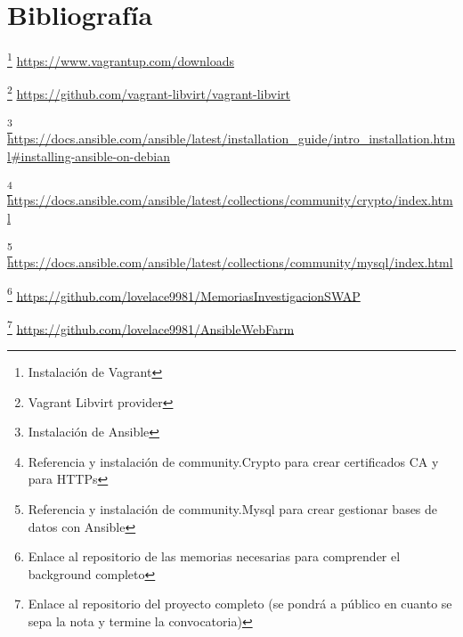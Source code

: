 \newpage
\section{Bibliografía}

\footnote{Instalación de Vagrant}
\textcolor{blue}{\url{https://www.vagrantup.com/downloads}}

\footnote{Vagrant Libvirt provider}
\textcolor{blue}{\url{https://github.com/vagrant-libvirt/vagrant-libvirt}}

\footnote{Instalación de Ansible}
\textcolor{blue}{\url{https://docs.ansible.com/ansible/latest/installation\_guide/intro\_installation.html\#installing-ansible-on-debian}}

\footnote{Referencia y instalación de community.Crypto para crear certificados CA y para HTTPs}
\textcolor{blue}{\url{https://docs.ansible.com/ansible/latest/collections/community/crypto/index.html}}

\footnote{Referencia y instalación de community.Mysql para crear gestionar bases de datos con Ansible}
\textcolor{blue}{\url{https://docs.ansible.com/ansible/latest/collections/community/mysql/index.html}}

\footnote{Enlace al repositorio de las memorias necesarias para comprender el background completo}
\textcolor{blue}{\url{https://github.com/lovelace9981/MemoriasInvestigacionSWAP}}

\footnote{Enlace al repositorio del proyecto completo (se pondrá a público en cuanto se sepa la nota y termine la convocatoria)}
\textcolor{blue}{\url{https://github.com/lovelace9981/AnsibleWebFarm}}
